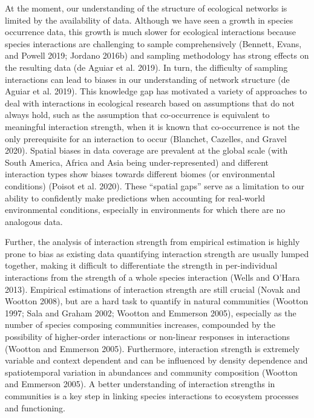 \documentclass[10pt,oneside]{article}
\begin{document}
At the moment, our understanding of the structure of ecological networks
is limited by the availability of data. Although we have seen a growth
in species occurrence data, this growth is much slower for ecological
interactions because species interactions are challenging to sample
comprehensively (Bennett, Evans, and Powell 2019; Jordano 2016b) and
sampling methodology has strong effects on the resulting data (de Aguiar
et al. 2019). In turn, the difficulty of sampling interactions can lead
to biases in our understanding of network structure (de Aguiar et al.
2019). This knowledge gap has motivated a variety of approaches to deal
with interactions in ecological research based on assumptions that do
not always hold, such as the assumption that co-occurrence is equivalent
to meaningful interaction strength, when it is known that co-occurrence
is not the only prerequisite for an interaction to occur (Blanchet,
Cazelles, and Gravel 2020). Spatial biases in data coverage are
prevalent at the global scale (with South America, Africa and Asia being
under-represented) and different interaction types show biases towards
different biomes (or environmental conditions) (Poisot et al. 2020).
These ``spatial gaps'' serve as a limitation to our ability to
confidently make predictions when accounting for real-world
environmental conditions, especially in environments for which there are
no analogous data.

Further, the analysis of interaction strength from empirical estimation
is highly prone to bias as existing data quantifying interaction
strength are usually lumped together, making it difficult to
differentiate the strength in per-individual interactions from the
strength of a whole species interaction (Wells and O'Hara 2013).
Empirical estimations of interaction strength are still crucial (Novak
and Wootton 2008), but are a hard task to quantify in natural
communities (Wootton 1997; Sala and Graham 2002; Wootton and Emmerson
2005), especially as the number of species composing communities
increases, compounded by the possibility of higher-order interactions or
non-linear responses in interactions (Wootton and Emmerson 2005).
Furthermore, interaction strength is extremely variable and context
dependent and can be influenced by density dependence and spatiotemporal
variation in abundances and community composition (Wootton and Emmerson
2005). A better understanding of interaction strengths in communities is
a key step in linking species interactions to ecosystem processes and
functioning.
\end{document}
